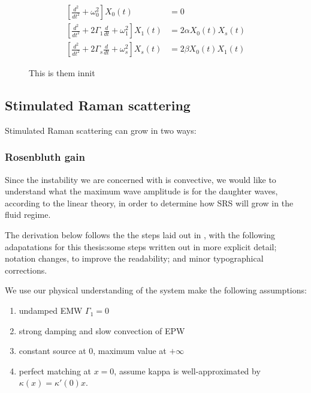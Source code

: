 \begin{subequations}\label{eqn:coupled-mode}
\begin{align}
\left[ \frac{d^{2}}{d t^{2}}+\omega_{0}^{2} \right] X_{0}(t) & = 0 \\
\left[ \frac{d^{2}}{d t^{2}}+2 \Gamma_{1} \frac{d}{d t}+\omega_{1}^{2} \right] X_{1}(t) &= 2\alpha X_0(t)X_s(t) \\
\left[ \frac{d^{2}}{d t^{2}}+2 \Gamma_{s} \frac{d}{d t}+\omega_{s}^{2} \right] X_{s}(t) &= 2\beta X_0(t)X_1(t)
\end{align}
\end{subequations} 


\begin{figure}[ht]
   \centering
    \caption{This is them innit}
    \label{fig:3wave_instabilities}
\end{figure}{}






\subsection{Stimulated Raman scattering}

Stimulated Raman scattering can grow in two ways: 

\subsubsection{Rosenbluth gain}

Since the instability we are concerned with is convective, we would like to understand what the maximum wave amplitude is for the daughter waves, according to the linear theory, in order to determine how SRS will grow in the fluid regime.

The derivation below follows the the steps laid out in \citet{Nishikawa1976}, with the following adapatations for this thesis:some steps written out in more explicit detail; notation changes, to improve the readability; and minor typographical corrections. 

We use our physical understanding of the system make the following assumptions:
\begin{enumerate}
	\item undamped EMW $\Gamma_1 = 0$
	\item strong damping and slow convection of EPW
	\item constant source at 0, maximum value at $+\infty$
	\item perfect matching at $x=0$, assume kappa is well-approximated by 
	$\kappa(x) = \kappa'(0)x$.
\end{enumerate}

